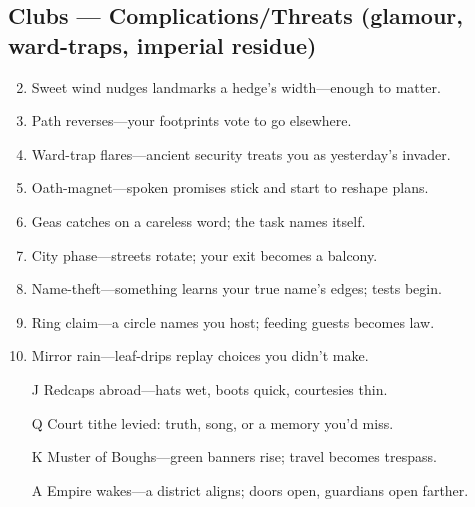 \subsection*{Clubs --- Complications/Threats (glamour, ward-traps, imperial residue)}
\label{sec:valewood-complications}
\begin{enumerate}
\setcounter{enumi}{1}
\item Sweet wind nudges landmarks a hedge's width---enough to matter.
\item Path reverses---your footprints vote to go elsewhere.
\item Ward-trap flares---ancient security treats you as yesterday's invader.
\item Oath-magnet---spoken promises stick and start to reshape plans.
\item Geas catches on a careless word; the task names itself.
\item City phase---streets rotate; your exit becomes a balcony.
\item Name-theft---something learns your true name's edges; tests begin.
\item Ring claim---a circle names you host; feeding guests becomes law.
\item Mirror rain---leaf-drips replay choices you didn't make.
\item[J] Redcaps abroad---hats wet, boots quick, courtesies thin.
\item[Q] Court tithe levied: truth, song, or a memory you'd miss.
\item[K] Muster of Boughs---green banners rise; travel becomes trespass.
\item[A] Empire wakes---a district aligns; doors open, guardians open farther.
\end{enumerate}

